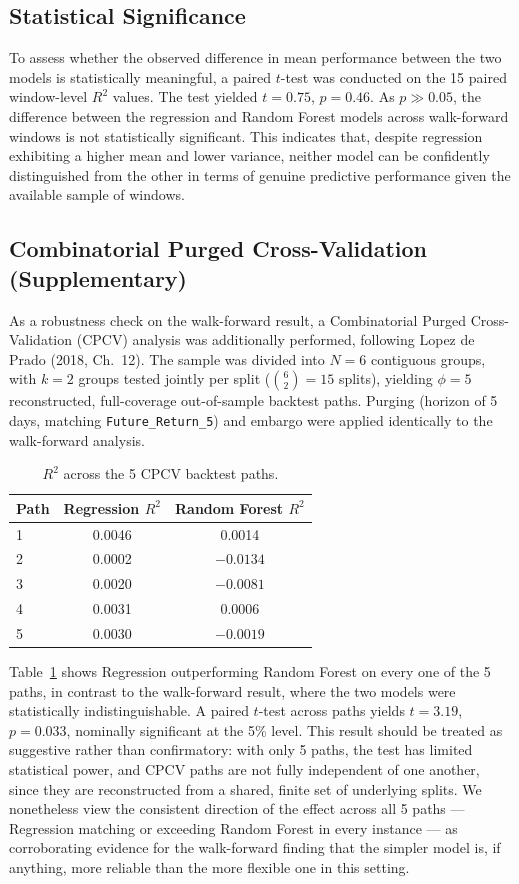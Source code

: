 \documentclass[11pt]{article}
\begin{document}
\subsection{Statistical Significance}

To assess whether the observed difference in mean performance between the two models is statistically meaningful, a paired $t$-test was conducted on the 15 paired window-level $R^2$ values. The test yielded $t = 0.75$, $p = 0.46$. As $p \gg 0.05$, the difference between the regression and Random Forest models across walk-forward windows is not statistically significant. This indicates that, despite regression exhibiting a higher mean and lower variance, neither model can be confidently distinguished from the other in terms of genuine predictive performance given the available sample of windows.

\subsection{Combinatorial Purged Cross-Validation (Supplementary)}

As a robustness check on the walk-forward result, a Combinatorial Purged
Cross-Validation (CPCV) analysis was additionally performed, following
Lopez de Prado (2018, Ch.~12). The sample was divided into $N=6$
contiguous groups, with $k=2$ groups tested jointly per split
($\binom{6}{2}=15$ splits), yielding $\phi = 5$ reconstructed,
full-coverage out-of-sample backtest paths. Purging (horizon of 5 days,
matching \texttt{Future\_Return\_5}) and embargo were applied identically
to the walk-forward analysis.

\begin{table}[h]
\centering
\begin{tabular}{lcc}
\toprule
Path & Regression $R^2$ & Random Forest $R^2$ \\
\midrule
1 & 0.0046  & 0.0014  \\
2 & 0.0002  & $-0.0134$ \\
3 & 0.0020  & $-0.0081$ \\
4 & 0.0031  & 0.0006  \\
5 & 0.0030  & $-0.0019$ \\
\bottomrule
\end{tabular}
\caption{$R^2$ across the 5 CPCV backtest paths.}
\label{tab:cpcv}
\end{table}

Table~\ref{tab:cpcv} shows Regression outperforming Random Forest on
every one of the 5 paths, in contrast to the walk-forward result, where
the two models were statistically indistinguishable. A paired $t$-test
across paths yields $t = 3.19$, $p = 0.033$, nominally significant at
the 5\% level. This result should be treated as suggestive rather than
confirmatory: with only 5 paths, the test has limited statistical power,
and CPCV paths are not fully independent of one another, since they are
reconstructed from a shared, finite set of underlying splits. We
nonetheless view the consistent direction of the effect across all 5
paths --- Regression matching or exceeding Random Forest in every
instance --- as corroborating evidence for the walk-forward finding that
the simpler model is, if anything, more reliable than the more flexible
one in this setting.
\end{document}
